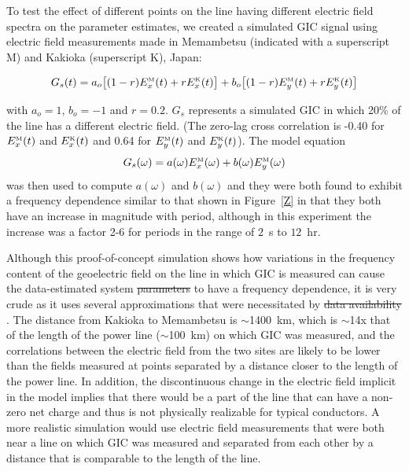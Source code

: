 \documentclass[draft,linenumbers]{agujournal2018}
\providecommand{\DIFaddtex}[1]{{\protect\color{blue}\uwave{#1}}} %
\providecommand{\DIFdeltex}[1]{{\protect\color{red}\sout{#1}}}                      %
\providecommand{\DIFaddbegin}{} %
\providecommand{\DIFaddend}{} %
\providecommand{\DIFdelbegin}{} %
\providecommand{\DIFdelend}{} %
\providecommand{\DIFadd}[1]{\texorpdfstring{\DIFaddtex{#1}}{#1}} %
\providecommand{\DIFdel}[1]{\texorpdfstring{\DIFdeltex{#1}}{}} %
\begin{document}
To test the effect of different points on the line having different electric field spectra on the parameter estimates, we created a simulated GIC signal using electric field measurements made in Memambetsu (indicated with a superscript M) and Kakioka (superscript K), Japan:

\begin{equation}
G_s(t)=a_o\big[(1-r)E^{\mbox{\tiny M}}_x(t) + rE^{\mbox{\tiny K}}_x(t)\big]+b_o\big[(1-r)E^{\mbox{\tiny M}}_y(t) + rE^{\mbox{\tiny K}}_y(t)\big]
\end{equation}

\noindent
with $a_o=1$, $b_o=-1$ and $r=0.2$. $G_s$ represents a simulated GIC in which 20\% of the line has a different electric field. (The zero-lag cross correlation is -0.40 for $E^{\mbox{\tiny M}}_x(t)$ and $E^{\mbox{\tiny K}}_x(t)$ and 0.64 for $E^{\mbox{\tiny M}}_y(t)$ and $E^{\mbox{\tiny K}}_y(t)$). The model equation
\begin{equation}
G_s(\omega)=a(\omega)E^{\mbox{\tiny M}}_x(\omega)+b(\omega)E^{\mbox{\tiny M}}_y(\omega)
\end{equation}
\noindent
was then used to compute $a(\omega)$ and $b(\omega)$ and they were both found to exhibit a frequency dependence similar to that shown in Figure~\ref{Z} in that they both have an increase in magnitude with period, although in this experiment the increase was a factor 2-6 for periods in the range of $2$~s to $12$~hr.

Although this proof-of-concept simulation shows how variations in the frequency content of the geoelectric field on the line in which GIC is measured can cause the data-estimated system \DIFdelbegin \DIFdel{parameters }\DIFdelend \DIFaddbegin \DIFadd{coefficients }\DIFaddend to have a frequency dependence, it is very crude as it uses several approximations that were necessitated by \DIFdelbegin \DIFdel{data availability }\DIFdelend \DIFaddbegin \DIFadd{the availability of data}\DIFaddend . The distance from Kakioka to Memambetsu is $\sim$1400~km, which is $\sim$14x that of the length of the power line ($\sim$100~km) on which GIC was measured, and the correlations between the electric field from the two sites are likely to be lower than the fields measured at points separated by a distance closer to the length of the power line. In addition, the discontinuous change in the electric field implicit in the model implies that there would be a part of the line that can have a non-zero net charge and thus is not physically realizable for typical conductors. A more realistic simulation would use electric field measurements that were both near a line on which GIC was measured and separated from each other by a distance that is comparable to the length of the line.
\end{document}

